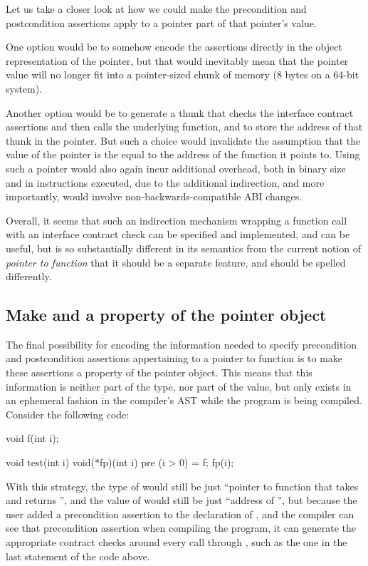 Let us take a closer look at how we could make the precondition and postcondition assertions apply to a pointer part of that pointer's value.

One option would be to somehow encode the assertions directly in the object representation of the pointer, but that would inevitably mean that the pointer value will no longer fit into a pointer-sized chunk of memory (8 bytes on a 64-bit system).

Another option would be to generate a thunk that checks the interface contract assertions and then calls the underlying function, and to store the address of that thunk in the pointer. But such a choice would invalidate the assumption that the value of the pointer is the equal to the address of the function it points to. Using such a pointer would also again incur additional overhead, both in binary size and in instructions executed, due to the additional indirection, and more importantly, would involve non-backwards-compatible ABI changes.

Overall, it seems that such an indirection mechanism wrapping a function call with an interface contract check can be specified and implemented, and can be useful, but is so substantially different in its semantics from the current notion of \emph{pointer to function} that it should be a separate feature, and should be spelled differently.

\subsection{Make  and  a property of the pointer object}

The final possibility for encoding the information needed to specify precondition and postcondition assertions appertaining to a pointer to function is to make these assertions a property of the pointer object. This means that this information is neither part of the type, nor part of the value, but only exists in an ephemeral fashion in the compiler's AST while the program is being compiled. Consider the following code:
\begin{codeblock}
void f(int i);

void test(int i) {
  void(*fp)(int i) pre (i > 0) = f;
  fp(i);
}
\end{codeblock}
With this strategy, the type of  would still be just ``pointer to function that takes  and returns '', and the value of  would still be just ``address of '', but because the user added a precondition assertion to the declaration of , and the compiler can see that precondition assertion when compiling the program, it can generate the appropriate contract checks around every call through , such as the one in the last statement of the code above.

